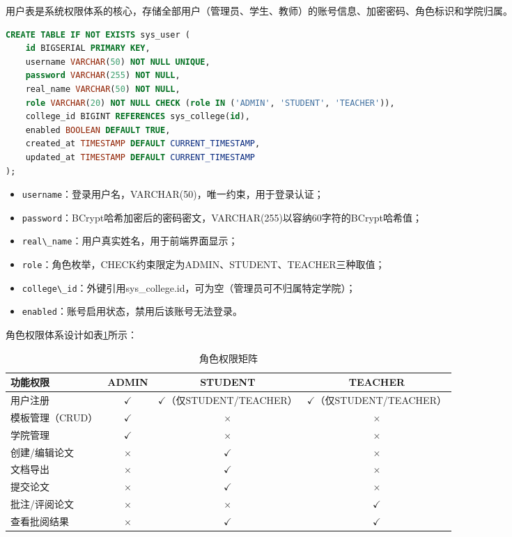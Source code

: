 用户表是系统权限体系的核心，存储全部用户（管理员、学生、教师）的账号信息、加密密码、角色标识和学院归属。

\begin{lstlisting}[language=SQL,caption={sys\_user 建表语句}]
CREATE TABLE IF NOT EXISTS sys_user (
    id BIGSERIAL PRIMARY KEY,
    username VARCHAR(50) NOT NULL UNIQUE,
    password VARCHAR(255) NOT NULL,
    real_name VARCHAR(50) NOT NULL,
    role VARCHAR(20) NOT NULL CHECK (role IN ('ADMIN', 'STUDENT', 'TEACHER')),
    college_id BIGINT REFERENCES sys_college(id),
    enabled BOOLEAN DEFAULT TRUE,
    created_at TIMESTAMP DEFAULT CURRENT_TIMESTAMP,
    updated_at TIMESTAMP DEFAULT CURRENT_TIMESTAMP
);
\end{lstlisting}

\begin{itemize}
    \item \verb|username|：登录用户名，VARCHAR(50)，唯一约束，用于登录认证；
    \item \verb|password|：BCrypt哈希加密后的密码密文，VARCHAR(255)以容纳60字符的BCrypt哈希值；
    \item \verb|real\_name|：用户真实姓名，用于前端界面显示；
    \item \verb|role|：角色枚举，CHECK约束限定为ADMIN、STUDENT、TEACHER三种取值；
    \item \verb|college\_id|：外键引用sys\_college.id，可为空（管理员可不归属特定学院）；
    \item \verb|enabled|：账号启用状态，禁用后该账号无法登录。
\end{itemize}

角色权限体系设计如表\ref{tab:role_auth}所示：

\begin{table}[htbp]
    \centering
    \caption{角色权限矩阵}
    \label{tab:role_auth}
    \begin{tabular}{|l|c|c|c|}
        \hline
        \textbf{功能权限} & \textbf{ADMIN} & \textbf{STUDENT} & \textbf{TEACHER} \\
        \hline
        用户注册 & $\checkmark$ & $\checkmark$（仅STUDENT/TEACHER） & $\checkmark$（仅STUDENT/TEACHER） \\
        \hline
        模板管理（CRUD） & $\checkmark$ & $\times$ & $\times$ \\
        \hline
        学院管理 & $\checkmark$ & $\times$ & $\times$ \\
        \hline
        创建/编辑论文 & $\times$ & $\checkmark$ & $\times$ \\
        \hline
        文档导出 & $\times$ & $\checkmark$ & $\times$ \\
        \hline
        提交论文 & $\times$ & $\checkmark$ & $\times$ \\
        \hline
        批注/评阅论文 & $\times$ & $\times$ & $\checkmark$ \\
        \hline
        查看批阅结果 & $\times$ & $\checkmark$ & $\checkmark$ \\
        \hline
    \end{tabular}
\end{table}


